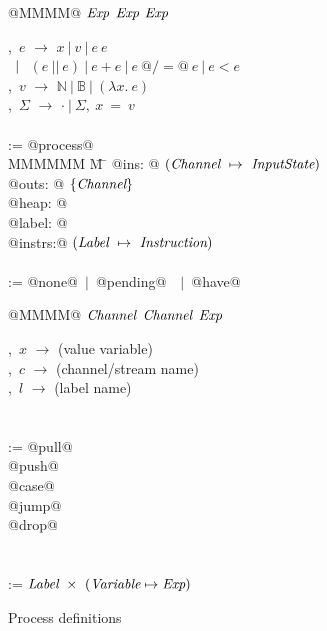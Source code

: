 
\begin{figure}
\begin{minipage}[t]{0.4\textwidth}
\begin{tabbing}
\Instr \TABDEF @MMMM@  \TABSKIP $\textit{Exp}$ \TABSKIP $\textit{Exp}$ \TABSKIP $\textit{Exp}$ \kill

\Exp,~$e$ \> $\to$ \> $x~|~v~|~e~e $ \\
  \> $\enskip|~$ \> $ (e~||~e) ~|~ e+e ~|~ e~@/=@~e ~|~ e < e$ \\
\Value,~$v$ \> $\to$ \> $\mathbb{N}~|~\mathbb{B}~|~(\lambda{}x.~e)$ \\
\Heap,~$\Sigma$ \> $\to$ \> $\cdot~|~\Sigma,~x~=~v$ \\
\\

\Proc \>:=\> @process@ \\
MMMMMM \= M \= \kill
\> \> @ins:   @  $(\textit{Channel} ~\mapsto~ \textit{InputState})$ \\
\> \> @outs:  @  $\{ \textit{Channel} \}$ \\
\> \> @heap:  @  \Heap \\
\> \> @label: @  \Label \\
\> \> @instrs:@  $(\textit{Label} ~\mapsto~ \textit{Instruction})$ \\
\\
\Instr \TABDEF \kill
\InputState \> := \> @none@~$|$~@pending@~\Value~$|$~@have@

\end{tabbing}
\end{minipage}
\begin{minipage}[t]{0.05\textwidth}
\quad
\end{minipage}
\begin{minipage}[t]{0.4\textwidth}
\begin{tabbing}
\Instr \TABDEF @MMMM@  \TABSKIP $\textit{Channel}$ \TABSKIP $\textit{Channel}$ \TABSKIP $\textit{Exp}$ \kill

\Var,~$x$ \> $\to$ \> (value variable) \\
\Chan,~$c$ \> $\to$ \> (channel/stream name) \\
\Label,~$l$ \> $\to$ \> (label name) \\
\\
\\

\Instr
    \> :=\> @pull@  \> \Chan  \> \Var  \> \Next \\
    \TABALT @push@  \> \Chan  \> \Exp  \> \Next \\
    \TABALT @case@  \> \Exp   \> \Next \> \Next \\
    \TABALT @jump@  \>        \>       \> \Next \\
    \TABALT @drop@  \> \Chan  \>       \> \Next \\
\\
\\
\Next \> := \> $\textit{Label}~\times~(\textit{Variable} \mapsto \textit{Exp})$ \\
\end{tabbing}
\end{minipage}
\caption{Process definitions}
\label{fig:Process:Def}
\end{figure}

